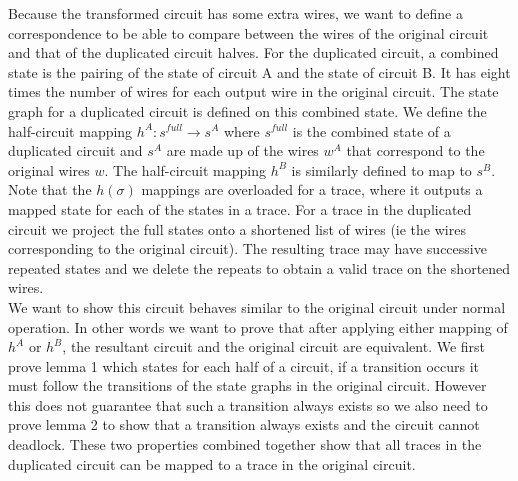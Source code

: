 \documentclass[12pt]{report}
\begin{document}
Because the transformed circuit has some extra wires, we want to define a correspondence to be able to compare between the wires of the original circuit and that of the duplicated circuit halves.  For the duplicated circuit, a combined state is the pairing of the state of circuit A and the state of circuit B. It has eight times the number of wires for each output wire in the original circuit.  The state graph for a duplicated circuit is defined on this combined state.  We define the half-circuit mapping $h^A: s^{full} \to s^A$ where $s^{full}$ is the combined state of a duplicated circuit and $s^A$ are made up of the wires $w^A$ that correspond to the original wires $w$.  The half-circuit mapping $h^B$ is similarly defined to map to $s^B$.  Note that the $h(\sigma)$ mappings are overloaded for a trace, where it outputs a mapped state for each of the states in a trace.  %
For a trace in the duplicated circuit we project the full states onto a shortened list of wires (ie the wires corresponding to the original circuit). The resulting trace may have successive repeated states and we delete the repeats to obtain a valid trace on the shortened wires.  %
\\

We want to show this circuit behaves similar to the original circuit under normal operation.  In other words we want to prove that after applying either mapping of $h^A$ or $h^B$, the resultant circuit and the original circuit are equivalent.  We first prove lemma 1 which states for each half of a circuit, if a transition occurs it must follow the transitions of the state graphs in the original circuit.  However this does not guarantee that such a transition always exists so we also need to prove lemma 2 to show that a transition always exists and the circuit cannot deadlock.  These two properties combined together show that all traces in the duplicated circuit can be mapped to a trace in the original circuit.\\
\end{document}
